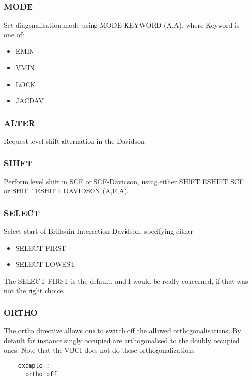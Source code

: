 \documentclass[11pt,fleqn]{article}
\begin{document}
\subsubsection{MODE}

Set diagonalisation mode using MODE KEYWORD (A,A), where Keyword is one of:

\begin{itemize}
\item EMIN
\item VMIN
\item LOCK
\item JACDAV
\end{itemize}

\subsubsection{ALTER}

Request level shift alternation in the Davidson

\subsubsection{SHIFT}

Perform level shift in SCF or SCF-Davidson, using either SHIFT ESHIFT SCF or
SHIFT ESHIFT DAVIDSON (A,F,A). 

\subsubsection{SELECT}

Select start of Brillouin Interaction Davidson, specifying either
\begin{itemize}
\item  SELECT FIRST
\item  SELECT LOWEST
\end{itemize}

The SELECT FIRST is the default, and I would be really concerned, if that 
was not the right choice.

\subsubsection{ORTHO}

The ortho directive allows one to switch off the allowed 
orthogonalisations; By default for instance singly occupied are
orthogonalised to the doubly occupied ones. Note that the VBCI
does not do these orthogonalizations 
    
\begin{verbatim}
    example :
      ortho off
\end{verbatim}
\end{document}
